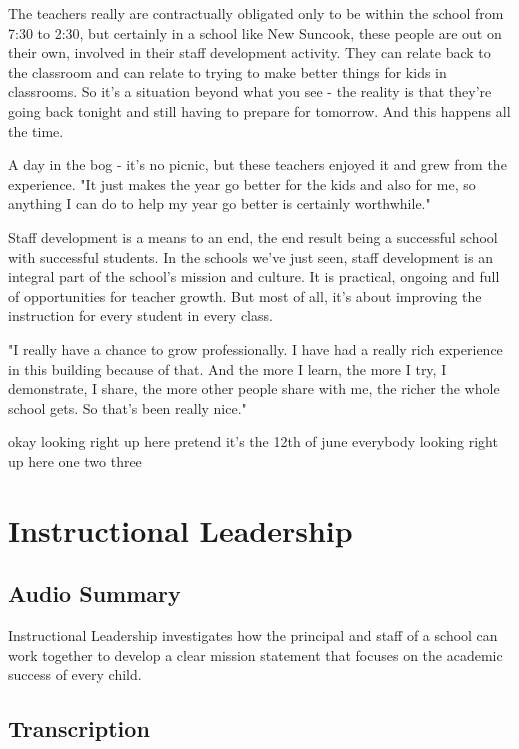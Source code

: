 The teachers really are contractually obligated only to be within the school from 7:30 to 2:30, but certainly in a school like New Suncook, these people are out on their own, involved in their staff development activity.
They can relate back to the classroom and can relate to trying to make better things for kids in classrooms.
So it's a situation beyond what you see - the reality is that they're going back tonight and still having to prepare for tomorrow.
And this happens all the time.

A day in the bog - it's no picnic, but these teachers enjoyed it and grew from the experience.
"It just makes the year go better for the kids and also for me, so anything I can do to help my year go better is certainly worthwhile."

Staff development is a means to an end, the end result being a successful school with successful students.
In the schools we've just seen, staff development is an integral part of the school's mission and culture.
It is practical, ongoing and full of opportunities for teacher growth.
But most of all, it's about improving the instruction for every student in every class.

"I really have a chance to grow professionally.
I have had a really rich experience in this building because of that.
And the more I learn, the more I try, I demonstrate, I share, the more other people share with me, the richer the whole school gets.
So that's been really nice."

okay looking
right up here
pretend it's the 12th of june everybody
looking right up here one
two three

\section{Instructional Leadership}

\subsection{Audio Summary}

Instructional Leadership investigates how the principal and staff of a school can work together to develop a clear mission statement that focuses on the academic success of every child.

\subsection{Transcription}

